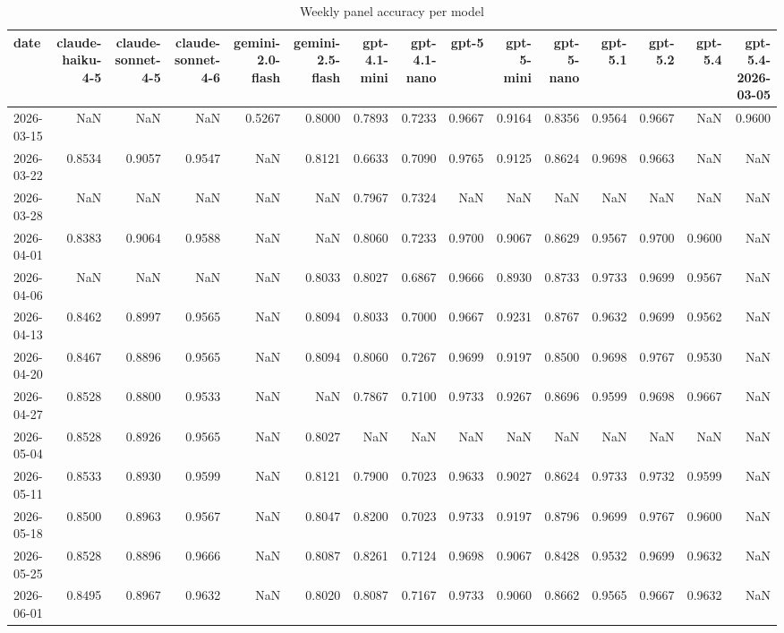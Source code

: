 \begin{table}
\caption{Weekly panel accuracy per model}
\label{tab:table-panel-timeline}
\begin{tabular}{lrrrrrrrrrrrrrr}
\toprule
date & claude-haiku-4-5 & claude-sonnet-4-5 & claude-sonnet-4-6 & gemini-2.0-flash & gemini-2.5-flash & gpt-4.1-mini & gpt-4.1-nano & gpt-5 & gpt-5-mini & gpt-5-nano & gpt-5.1 & gpt-5.2 & gpt-5.4 & gpt-5.4-2026-03-05 \\
\midrule
2026-03-15 & NaN & NaN & NaN & 0.5267 & 0.8000 & 0.7893 & 0.7233 & 0.9667 & 0.9164 & 0.8356 & 0.9564 & 0.9667 & NaN & 0.9600 \\
2026-03-22 & 0.8534 & 0.9057 & 0.9547 & NaN & 0.8121 & 0.6633 & 0.7090 & 0.9765 & 0.9125 & 0.8624 & 0.9698 & 0.9663 & NaN & NaN \\
2026-03-28 & NaN & NaN & NaN & NaN & NaN & 0.7967 & 0.7324 & NaN & NaN & NaN & NaN & NaN & NaN & NaN \\
2026-04-01 & 0.8383 & 0.9064 & 0.9588 & NaN & NaN & 0.8060 & 0.7233 & 0.9700 & 0.9067 & 0.8629 & 0.9567 & 0.9700 & 0.9600 & NaN \\
2026-04-06 & NaN & NaN & NaN & NaN & 0.8033 & 0.8027 & 0.6867 & 0.9666 & 0.8930 & 0.8733 & 0.9733 & 0.9699 & 0.9567 & NaN \\
2026-04-13 & 0.8462 & 0.8997 & 0.9565 & NaN & 0.8094 & 0.8033 & 0.7000 & 0.9667 & 0.9231 & 0.8767 & 0.9632 & 0.9699 & 0.9562 & NaN \\
2026-04-20 & 0.8467 & 0.8896 & 0.9565 & NaN & 0.8094 & 0.8060 & 0.7267 & 0.9699 & 0.9197 & 0.8500 & 0.9698 & 0.9767 & 0.9530 & NaN \\
2026-04-27 & 0.8528 & 0.8800 & 0.9533 & NaN & NaN & 0.7867 & 0.7100 & 0.9733 & 0.9267 & 0.8696 & 0.9599 & 0.9698 & 0.9667 & NaN \\
2026-05-04 & 0.8528 & 0.8926 & 0.9565 & NaN & 0.8027 & NaN & NaN & NaN & NaN & NaN & NaN & NaN & NaN & NaN \\
2026-05-11 & 0.8533 & 0.8930 & 0.9599 & NaN & 0.8121 & 0.7900 & 0.7023 & 0.9633 & 0.9027 & 0.8624 & 0.9733 & 0.9732 & 0.9599 & NaN \\
2026-05-18 & 0.8500 & 0.8963 & 0.9567 & NaN & 0.8047 & 0.8200 & 0.7023 & 0.9733 & 0.9197 & 0.8796 & 0.9699 & 0.9767 & 0.9600 & NaN \\
2026-05-25 & 0.8528 & 0.8896 & 0.9666 & NaN & 0.8087 & 0.8261 & 0.7124 & 0.9698 & 0.9067 & 0.8428 & 0.9532 & 0.9699 & 0.9632 & NaN \\
2026-06-01 & 0.8495 & 0.8967 & 0.9632 & NaN & 0.8020 & 0.8087 & 0.7167 & 0.9733 & 0.9060 & 0.8662 & 0.9565 & 0.9667 & 0.9632 & NaN \\

\end{tabular}
\end{table}
